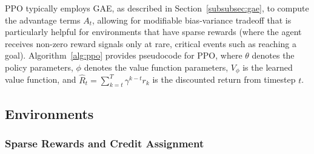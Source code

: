PPO typically employs GAE, as described in Section~\ref{subsubsec:gae}, to compute the advantage terms $A_t$, allowing for modifiable bias-variance tradeoff that is particularly helpful for environments that have sparse rewards (where the agent receives non-zero reward signals only at rare, critical events such as reaching a goal). Algorithm~\ref{alg:ppo} provides pseudocode for PPO, where $\theta$ denotes the policy parameters, $\phi$ denotes the value function parameters, $V_\phi$ is the learned value function, and $\hat{R}_t = \sum_{k=t}^{T} \gamma^{k-t} r_k$ is the discounted return from timestep $t$.

\begin{algorithm}[H]
\caption{Proximal Policy Optimization (PPO)}
\label{alg:ppo}
\end{algorithm}

\subsection{Environments}\label{subsec:environments}

\subsubsection{Sparse Rewards and Credit Assignment}\label{subsubsec:sparse_rewards}

